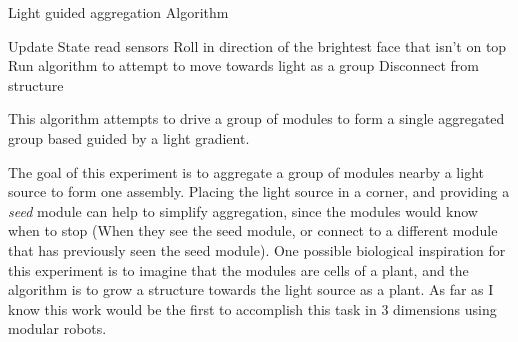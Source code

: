 \setcounter{algorithm}{1}
\begin{algorithm}[htbp] 
	\caption{Light guided aggregation Algorithm}
	\label{algorithmAggregate}
	\SetAlgoLined
	{
		Update State read sensors\;
		{
			Roll in direction of the brightest face that isn't on top\;
		}
		{
			Run algorithm to attempt to move towards light as a group\;
		}
		{
			Disconnect from structure
		}
	}
	\caption{This algorithm attempts to drive a group of modules to form a single aggregated group based guided by a light gradient.}
\end{algorithm}


The goal of this experiment is to aggregate a group of modules nearby a light source to form one assembly. Placing the light source in a corner, and providing a \emph{seed} module can help to simplify aggregation, since the modules would know when to stop (When they see the seed module, or connect to a different module that has previously seen the seed module). One possible biological inspiration for this experiment is to imagine that the modules are cells of a plant, and the algorithm is to grow a structure towards the light source as a plant. As far as I know this work would be the first to accomplish this task in 3 dimensions using modular robots.
















%
%	
%	
%	

